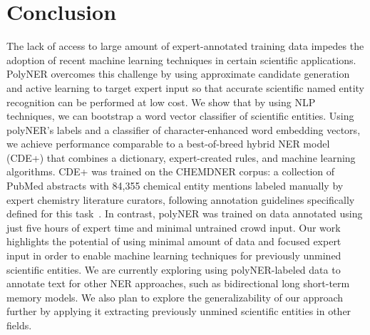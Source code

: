 \section{Conclusion}
\label{sect:apner_conclusion}
The lack of access to large amount of expert-annotated training data impedes the adoption of recent machine learning techniques in certain scientific applications.
PolyNER overcomes this challenge by %
using
approximate candidate generation and active learning to target 
expert input so that accurate scientific named entity recognition can be performed at low cost.
We show that by using NLP techniques, we can bootstrap a word vector classifier of scientific entities.
Using polyNER's labels and a classifier of character-enhanced word embedding vectors, we achieve 
performance comparable to a best-of-breed
hybrid NER model (CDE+) that combines a dictionary, expert-created
rules, and machine learning algorithms.
CDE+ was trained on the CHEMDNER corpus:
a collection of  PubMed abstracts with 84,355 chemical entity mentions labeled manually by expert chemistry literature curators, following annotation guidelines specifically defined for this task~\cite{krallinger2015chemdner}. 
In contrast, polyNER was trained on data annotated using just five hours of expert time and minimal untrained crowd input.
Our work highlights the potential of using minimal amount of data and focused expert input in order to enable machine learning techniques for previously unmined scientific entities. 
We are currently exploring using polyNER-labeled data to annotate text for other NER approaches,
such as bidirectional long short-term memory models.
We also plan to explore the generalizability of our approach further by applying it extracting previously unmined scientific entities in other fields.
